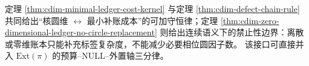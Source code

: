 \begin{remark}[与扩展保存口径的接口]\label{rem:cdim-kernel-defect-extpi-interface}
定理 \ref{thm:cdim-minimal-ledger-cost-kernel} 与定理 \ref{thm:cdim-defect-chain-rule} 共同给出“核圆维 \(\leftrightarrow\) 最小补账成本”的可加守恒律；定理 \ref{thm:cdim-zero-dimensional-ledger-no-circle-replacement} 则给出连续语义下的禁止性边界：离散或零维账本只能补充标签复杂度，不能减少必要相位圆因子数。
该接口可直接并入 \(\mathrm{Ext}(\pi)\) 的预算--NULL--外置轴三分律。
\end{remark}

\endinput
